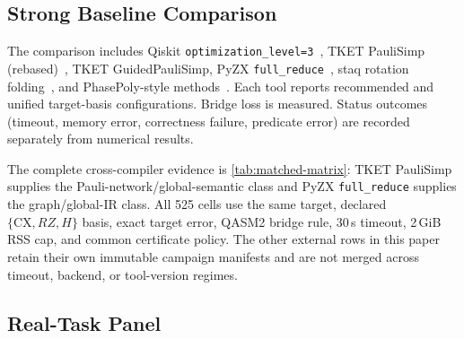 \documentclass[aps,prx,reprint,floatfix,superscriptaddress]{revtex4-2}
\begin{document}
\subsection{Strong Baseline Comparison}

The comparison includes Qiskit \texttt{optimization\_level=3}~\cite{javadi2024qiskit},
TKET PauliSimp (rebased)~\cite{sivarajah2021tket,cowtan2020phase}, TKET
GuidedPauliSimp, PyZX \texttt{full\_reduce}~\cite{kissinger2020pyzx}, staq
rotation folding~\cite{amy2020staq}, and PhasePoly-style
methods~\cite{nam2018automated}. Each tool reports recommended and unified
target-basis configurations. Bridge loss is measured. Status outcomes
(timeout, memory error, correctness failure, predicate error) are recorded
separately from numerical results.

The complete cross-compiler evidence is \cref{tab:matched-matrix}: TKET
PauliSimp supplies the Pauli-network/global-semantic class and PyZX
\texttt{full\_reduce} supplies the graph/global-IR class.  All 525 cells use the
same target, declared $\{\mathrm{CX},RZ,H\}$ basis, exact target error, QASM2
bridge rule, 30\,s timeout, 2\,GiB RSS cap, and common certificate policy.
The other external rows in this paper retain their own immutable campaign
manifests and are not merged across timeout, backend, or tool-version regimes.

\subsection{Real-Task Panel}
\end{document}

